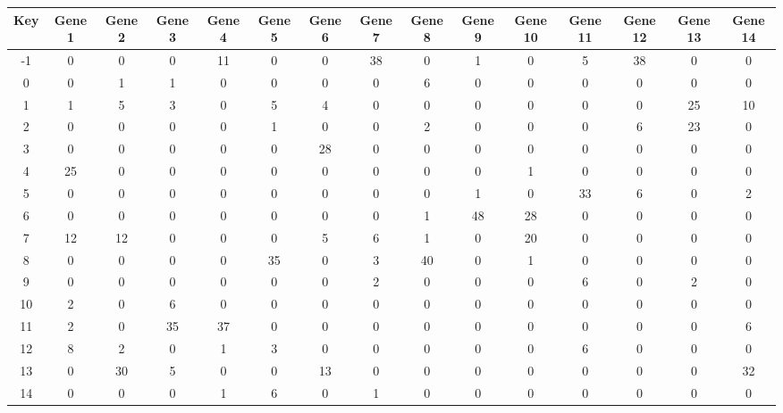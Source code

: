 \begin{tabular}{|c|c|c|c|c|c|c|c|c|c|c|c|c|c|c|}
\hline
Key & Gene 1 & Gene 2 & Gene 3 & Gene 4 & Gene 5 & Gene 6 & Gene 7 & Gene 8 & Gene 9 & Gene 10 & Gene 11 & Gene 12 & Gene 13 & Gene 14 \\
\hline
-1 & 0 & 0 & 0 & 11 & 0 & 0 & 38 & 0 & 1 & 0 & 5 & 38 & 0 & 0 \\
0 & 0 & 1 & 1 & 0 & 0 & 0 & 0 & 6 & 0 & 0 & 0 & 0 & 0 & 0 \\
1 & 1 & 5 & 3 & 0 & 5 & 4 & 0 & 0 & 0 & 0 & 0 & 0 & 25 & 10 \\
2 & 0 & 0 & 0 & 0 & 1 & 0 & 0 & 2 & 0 & 0 & 0 & 6 & 23 & 0 \\
3 & 0 & 0 & 0 & 0 & 0 & 28 & 0 & 0 & 0 & 0 & 0 & 0 & 0 & 0 \\
4 & 25 & 0 & 0 & 0 & 0 & 0 & 0 & 0 & 0 & 1 & 0 & 0 & 0 & 0 \\
5 & 0 & 0 & 0 & 0 & 0 & 0 & 0 & 0 & 1 & 0 & 33 & 6 & 0 & 2 \\
6 & 0 & 0 & 0 & 0 & 0 & 0 & 0 & 1 & 48 & 28 & 0 & 0 & 0 & 0 \\
7 & 12 & 12 & 0 & 0 & 0 & 5 & 6 & 1 & 0 & 20 & 0 & 0 & 0 & 0 \\
8 & 0 & 0 & 0 & 0 & 35 & 0 & 3 & 40 & 0 & 1 & 0 & 0 & 0 & 0 \\
9 & 0 & 0 & 0 & 0 & 0 & 0 & 2 & 0 & 0 & 0 & 6 & 0 & 2 & 0 \\
10 & 2 & 0 & 6 & 0 & 0 & 0 & 0 & 0 & 0 & 0 & 0 & 0 & 0 & 0 \\
11 & 2 & 0 & 35 & 37 & 0 & 0 & 0 & 0 & 0 & 0 & 0 & 0 & 0 & 6 \\
12 & 8 & 2 & 0 & 1 & 3 & 0 & 0 & 0 & 0 & 0 & 6 & 0 & 0 & 0 \\
13 & 0 & 30 & 5 & 0 & 0 & 13 & 0 & 0 & 0 & 0 & 0 & 0 & 0 & 32 \\
14 & 0 & 0 & 0 & 1 & 6 & 0 & 1 & 0 & 0 & 0 & 0 & 0 & 0 & 0 \\
\hline
\end{tabular}